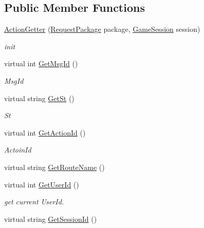 \subsection*{Public Member Functions}
\begin{DoxyCompactItemize}
\item 
\mbox{\hyperlink{class_t_net_1_1_service_1_1_action_getter_a7b3352e652569624636f868760a6ff5d}{Action\+Getter}} (\mbox{\hyperlink{class_t_net_1_1_contract_1_1_request_package}{Request\+Package}} package, \mbox{\hyperlink{class_t_net_1_1_contract_1_1_game_session}{Game\+Session}} session)
\begin{DoxyCompactList}\small\item\em init \end{DoxyCompactList}\item 
virtual int \mbox{\hyperlink{class_t_net_1_1_service_1_1_action_getter_a006cdd9ff390b8960732054f3df96d90}{Get\+Msg\+Id}} ()
\begin{DoxyCompactList}\small\item\em Msg\+Id \end{DoxyCompactList}\item 
virtual string \mbox{\hyperlink{class_t_net_1_1_service_1_1_action_getter_a28cf34ec64abdebcdadbdc0fbc6163b9}{Get\+St}} ()
\begin{DoxyCompactList}\small\item\em St \end{DoxyCompactList}\item 
virtual int \mbox{\hyperlink{class_t_net_1_1_service_1_1_action_getter_a174e4f8b5f3ca0b236c3984e83276f83}{Get\+Action\+Id}} ()
\begin{DoxyCompactList}\small\item\em Actoin\+Id \end{DoxyCompactList}\item 
virtual string \mbox{\hyperlink{class_t_net_1_1_service_1_1_action_getter_aec5042cf79994966cc93ce581e98acba}{Get\+Route\+Name}} ()
\item 
virtual int \mbox{\hyperlink{class_t_net_1_1_service_1_1_action_getter_acb84776850a854df5baeefa4738da0c8}{Get\+User\+Id}} ()
\begin{DoxyCompactList}\small\item\em get current User\+Id. \end{DoxyCompactList}\item 
virtual string \mbox{\hyperlink{class_t_net_1_1_service_1_1_action_getter_a7f53cc5d729e714b6a458f733d2d2926}{Get\+Session\+Id}} ()
\item 

\end{DoxyCompactItemize}
